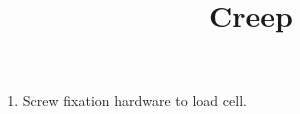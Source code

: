 \documentclass[11pt, oneside]{article}   	%
\title{Creep}
\begin{document}
\maketitle 							%
\date{}							%

\begin{enumerate}

\item Screw fixation hardware to load cell.



\end{enumerate}
\end{document}
